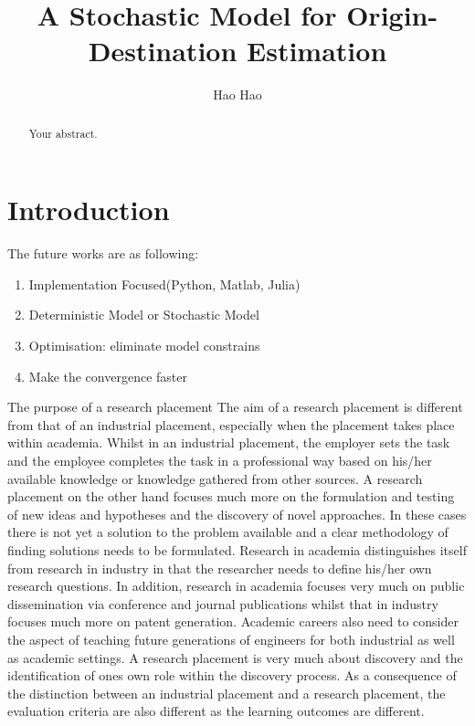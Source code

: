 \documentclass[a4paper]{article}
\title{A Stochastic Model for Origin-Destination Estimation}
\author{Hao Hao}
\begin{document}
\maketitle

\begin{abstract}
Your abstract.
\end{abstract}

\section{Introduction}

The future works are as following:
\begin{enumerate}
  \item Implementation Focused(Python, Matlab, Julia)
  \item Deterministic Model or Stochastic Model
  \item Optimisation: eliminate model constrains
  \item Make the convergence faster  
\end{enumerate}

The purpose of a research placement
The aim of a research placement is different from that of an industrial placement, especially when the placement takes place within academia.
Whilst in an industrial placement, the employer sets the task and the employee completes the task in a professional way based on his/her available knowledge or knowledge gathered from other sources. A research placement on the other hand focuses much more on the formulation and testing of new ideas and hypotheses and the discovery of novel approaches. In these cases there is not yet a solution to the problem available and a clear methodology of finding solutions needs to be formulated. Research in academia distinguishes itself from research in industry in that the researcher needs to define his/her own research questions. In addition, research in academia focuses very much on public dissemination via conference and journal publications whilst that in industry focuses much more on patent generation. Academic careers also need to consider the aspect of teaching future generations of engineers for both industrial as well as academic settings.
A research placement is very much about discovery and the identification of ones own role within the discovery process.
As a consequence of the distinction between an industrial placement and a research placement, the evaluation criteria are also different as the learning outcomes are different.
\end{document}
